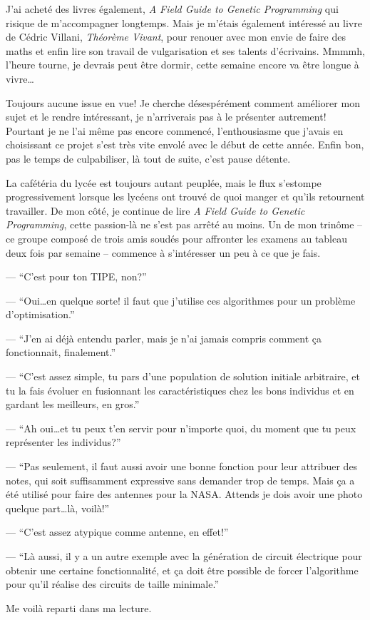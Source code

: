 \documentclass[letterpaper, 12pt]{article} %
\begin{document}
{J'ai acheté des livres également, \textit{A Field Guide to Genetic Programming} qui risique de m'accompagner longtemps.
Mais je m'étais également intéressé au livre de Cédric Villani, \textit{Théorème Vivant}, pour renouer avec mon envie de faire des maths et enfin lire son travail de vulgarisation et ses talents d'écrivains. 
Mmmmh, l'heure tourne, je devrais peut être dormir, cette semaine encore va être longue à vivre\dots

Toujours aucune issue en vue!
Je cherche désespérément comment améliorer mon sujet et le rendre intéressant, je n'arriverais pas à le présenter autrement!
Pourtant je ne l'ai même pas encore commencé, l'enthousiasme que j'avais en choisissant ce projet s'est très vite envolé avec le début de cette année.
Enfin bon, pas le temps de culpabiliser, là tout de suite, c'est pause détente. 

La cafétéria du lycée est toujours autant peuplée, mais le flux s'estompe progressivement lorsque les lycéens ont trouvé de quoi manger et qu'ils retournent travailler. 
De mon côté, je continue de lire \textit{A Field Guide to Genetic Programming}, cette passion-là ne s'est pas arrêté au moins.
Un de mon trinôme -- ce groupe composé de trois amis soudés pour affronter les examens au tableau deux fois par semaine -- commence à s'intéresser un peu à ce que je fais.

--- ``C'est pour ton TIPE, non?''

--- ``Oui\dots en quelque sorte! il faut que j'utilise ces algorithmes pour un problème d'optimisation.''

--- ``J'en ai déjà entendu parler, mais je n'ai jamais compris comment ça fonctionnait, finalement.''

--- ``C'est assez simple, tu pars d'une population de solution initiale arbitraire, et tu la fais évoluer en fusionnant les caractéristiques chez les 			bons individus et en gardant les meilleurs, en gros.''

--- ``Ah oui\dots et tu peux t'en servir pour n'importe quoi, du moment que tu peux représenter les individus?''

--- ``Pas seulement, il faut aussi avoir une bonne fonction pour leur attribuer des notes, qui soit suffisamment expressive sans demander trop de temps. 		Mais ça a été utilisé pour faire des antennes pour la {NASA}. Attends je dois avoir une photo quelque part\dots là, voilà!''

--- ``C'est assez atypique comme antenne, en effet!''

--- ``Là aussi, il y a un autre exemple avec la génération de circuit électrique pour obtenir une certaine fonctionnalité, et ça doit être possible de 			forcer l'algorithme pour qu'il réalise des circuits de taille minimale.''

Me voilà reparti dans ma lecture.








}
\end{document}
